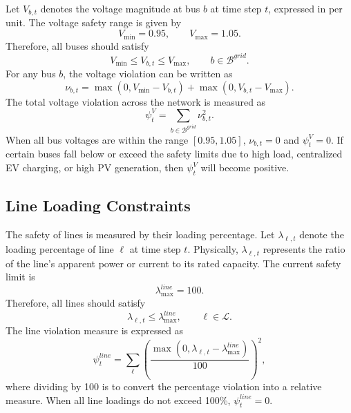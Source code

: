 Let \(V_{b,t}\) denotes the voltage magnitude at bus \(b\) at time step \(t\), expressed in per unit. The voltage safety range is given by
\[
  V_{\min}=0.95,\qquad V_{\max}=1.05.
\]
Therefore, all buses should satisfy
\[
  V_{\min}\le V_{b,t}\le V_{\max},
  \qquad b\in\mathcal{B}^{grid}.
\]
For any bus \(b\), the voltage violation can be written as
\[
  \nu_{b,t}
  =
  \max(0,V_{\min}-V_{b,t})
  +
  \max(0,V_{b,t}-V_{\max}).
\]
The total voltage violation across the network is measured as
\[
  \psi^V_t=\sum_{b\in\mathcal{B}^{grid}}\nu_{b,t}^2.
\]
When all bus voltages are within the range \([0.95,1.05]\), \(\nu_{b,t}=0\) and \(\psi^V_t=0\). If certain buses fall below or exceed the safety limits due to high load, centralized EV charging, or high PV generation, then \(\psi^V_t\) will become positive.

\subsection{Line Loading Constraints}

The safety of lines is measured by their loading percentage. Let \(\lambda_{\ell,t}\) denote the loading percentage of line \(\ell\) at time step \(t\). Physically, \(\lambda_{\ell,t}\) represents the ratio of the line's apparent power or current to its rated capacity. The current safety limit is
\[
  \lambda^{line}_{\max}=100.
\]
Therefore, all lines should satisfy
\[
  \lambda_{\ell,t}\le \lambda^{line}_{\max},
  \qquad \ell\in\mathcal{L}.
\]
The line violation measure is expressed as
\[
  \psi^{line}_t
  =
  \sum_{\ell}
  \left(
  \frac{\max(0,\lambda_{\ell,t}-\lambda^{line}_{\max})}{100}
  \right)^2,
\]
where dividing by 100 is to convert the percentage violation into a relative measure. When all line loadings do not exceed 100\%, \(\psi^{line}_t=0\).

